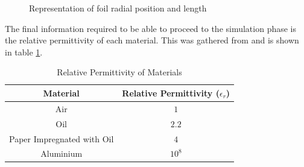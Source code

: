 \begin{figure}[!htb]
  \centering
\caption{Representation of foil radial position and length}
  \label{Figure:Both21plots}
\end{figure}

The final information required to be able to proceed to the simulation phase is the relative permittivity of each material.
This was gathered from \cite{Ahmed11} and is shown in table \ref{table:perm}.

\begin{table}[!htb]
\caption{Relative Permittivity of Materials}
\label{table:perm}
\begin{center}
\begin{tabular}{cc}
\toprule
\textbf{Material} & \textbf{Relative Permittivity ($\epsilon_r$)} \\ \toprule
Air & $1$ \\
Oil &$ 2.2$ \\
Paper Impregnated with Oil &$ 4$ \\
Aluminium & $10^8$\\
\bottomrule
\end{tabular}
\end{center}
\end{table}

